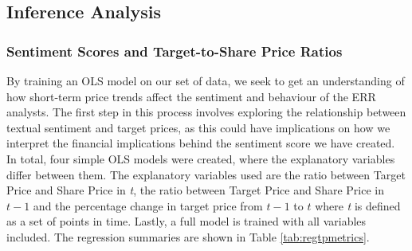 

\subsection{Inference Analysis}
\subsubsection{Sentiment Scores and Target-to-Share Price Ratios}
\label{Sec:SentTarget}

By training an OLS model on our set of data, we seek to get an understanding of how short-term price trends affect the sentiment and behaviour of the ERR analysts. The first step in this process involves exploring the relationship between textual sentiment and target prices, as this could have implications on how we interpret the financial implications behind the sentiment score we have created. In total, four simple OLS models were created, where the explanatory variables differ between them. The explanatory variables used are the ratio between Target Price and Share Price in \textit{t}, the ratio between Target Price and Share Price in \(t-1\) and the percentage change in target price from \(t-1\) to \(t\) where \textit{t} is defined as a set of points in time. Lastly, a full model is trained with all variables included. The regression summaries are shown in Table \ref{tab:regtpmetrics}.



